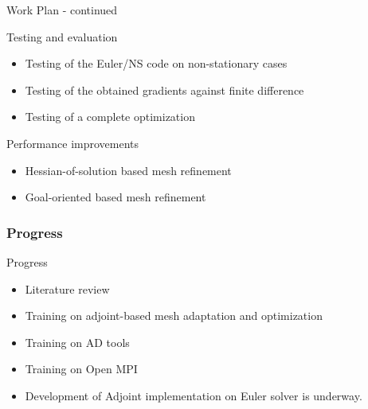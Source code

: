 \begin{frame}{Work Plan - continued}
\begin{block}{Testing and evaluation}
\begin{itemize}
\item Testing of the Euler/NS code on non-stationary cases
\item Testing of the obtained gradients against finite difference
\item Testing of a complete optimization
\end{itemize}
\end{block}
\begin{block}{Performance improvements}
\begin{itemize}
\item Hessian-of-solution based mesh refinement
\item Goal-oriented based mesh refinement
\end{itemize}
\end{block}
\end{frame}



\begin{frame}
\frametitle{Progress}
\begin{block}{Progress}
\begin{itemize}
\item Literature review
\item Training on adjoint-based mesh adaptation and optimization
\item Training on AD tools
\item Training on Open MPI
\item Development of Adjoint implementation on Euler solver is underway.
\end{itemize}
\end{block}
\end{frame}

